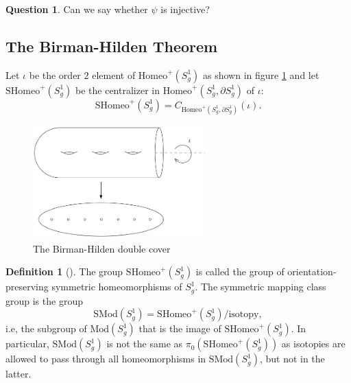 \documentclass[reqno]{amsart}
\theoremstyle{definition}
\newtheorem{definition}[theorem]{Definition}
\newtheorem{question}[theorem]{Question}
\theoremstyle{remark}
\newcommand{\Mod}{{\mathrm{Mod}}}
\newcommand{\SMod}{{\mathrm{SMod}}}
\newcommand{\Homeo}{{\mathrm{Homeo}}}
\newcommand{\SHomeo}{{\mathrm{SHomeo}}}
\begin{document}
 \begin{question}
     Can we say whether $\psi $ is injective?
 \end{question}

 \subsection{The Birman-Hilden Theorem}
Let $\iota$ be the order  $2$ element of
$\Homeo^{+} \left( S_g^{1} \right) $ as
shown in figure \ref{fig:birman-hilden-double-cover-png}
and let $\SHomeo^{+} \left( S_g^{1} \right) $ be
the centralizer in
$\Homeo^{+}\left( S_g^{1}, \partial S_g^{1} \right) $ of
$\iota$:
\[
\SHomeo^{+} \left( S_g^{1} \right) 
= C_{\Homeo^{+} \left( S_g^{1}, \partial
S_g^{1} \right) }\left( \iota \right) .
\] 

 \begin{figure}[H]
     \centering
     \includegraphics[width=0.6\textwidth]{birman-hilden-double-cover.png}
     \caption{The Birman-Hilden double cover}
     \label{fig:birman-hilden-double-cover-png}
 \end{figure}

 \begin{definition}[]
 The group $\SHomeo^{+} \left( S_g^{1} \right) $ is
 called the group of orientation-preserving
 symmetric homeomorphisms of $S_g^{1}$. 
 The symmetric mapping class group is the group
 \[
 \SMod (S_g^{1}) = 
 \SHomeo^{+} \left( S_g^{1} \right) / \text{isotopy},
 \] 
 i.e, the subgroup of $\Mod \left( S_g^{1} \right) $ that
 is the image of $\SHomeo^{+} \left( S_g^{1} \right) $.
 In particular,
 $\SMod \left( S_g^{1} \right) $ is not the same
 as
 $\pi_0 \left( \SHomeo^{+} 
 \left( S_g^{1} \right) \right) $ as isotopies are
 allowed to pass through all homeomorphisms 
 in $\SMod \left( S_g^{1} \right) $, but not
 in the latter.
 \end{definition}
\end{document}
